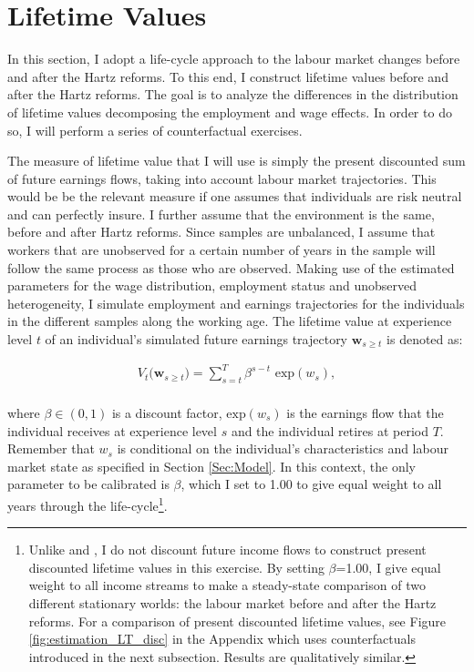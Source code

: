\documentclass[12pt, a4paper]{article}
\let\Oldsection\section
\renewcommand{\section}{\FloatBarrier\Oldsection}
\begin{document}
\section{Lifetime Values}

In this section, I adopt a life-cycle approach to the labour market changes before and after the Hartz reforms. To this end, I construct lifetime values before and after the Hartz reforms. The goal is to analyze the differences in the distribution of lifetime values decomposing the employment and wage effects. In order to do so, I will perform a series of counterfactual exercises. 

The measure of lifetime value that I will use is simply the present discounted sum of future earnings flows, taking into account labour market trajectories. This would be be the relevant measure if one assumes that individuals are risk neutral and can perfectly insure. I further assume that the environment is the same, before and after Hartz reforms. Since samples are unbalanced, I assume that workers that are unobserved for a certain number of years in the sample will follow the same process as those who are observed. Making use of the estimated parameters for the wage distribution, employment status and unobserved heterogeneity, I simulate employment and earnings trajectories for the individuals in the different samples along the working age. The lifetime value at experience level $t$ of an individual's simulated future earnings trajectory $\textbf{w}_{s\geq t}$ is denoted as:

\begin{align}\label{eq:LT_Values}
V_{t} \big(\textbf{w}_{s\geq t} \big) = \sum_{s=t}^{T} \beta^{s-t} \,\, \text{exp}(w_s) , 	\\ \nonumber
\end{align}

where $\beta \in (0,1)$ is a discount factor, $\text{exp}(w_s)$ is the earnings flow that the individual receives at experience level $s$ and the individual retires at period $T$. Remember that $w_s$ is conditional on the individual's characteristics and labour market state as specified in Section \ref{Sec:Model}. In this context, the only parameter to be calibrated is $\beta$, which I set to 1.00 to give equal weight to all years through the life-cycle\footnote{Unlike \cite{PoTu05} and \cite{DiPoTu14}, I do not discount future income flows to construct present discounted lifetime values in this exercise. By setting $\beta$=1.00, I give equal weight to all income streams to make a steady-state comparison of two different stationary worlds: the labour market before and after the Hartz reforms. For a comparison of present discounted lifetime values, see Figure \ref{fig:estimation_LT_disc} in the Appendix which uses counterfactuals introduced in the next subsection. Results are qualitatively similar.}. 
\end{document}
